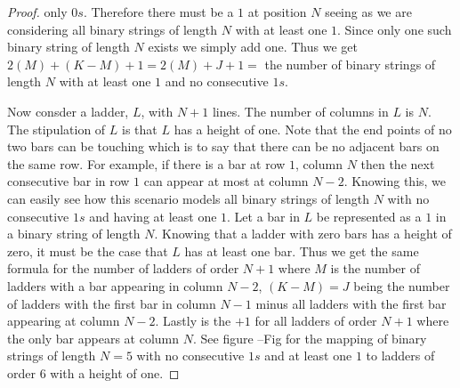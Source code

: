 \begin{proof}
    only $0s$. Therefore there must be a $1$ at position $N$ seeing as we are considering all binary strings of length $N$ with at least one $1$. 
    Since only one such binary string of length $N$ exists we simply add one. Thus we get $2(M)+(K-M)+1=2(M)+J+1=$ the number of binary strings of length $N$ with at least one $1$ and 
    no consecutive $1s$.\par 
    Now consder a ladder, $L$, with $N+1$ lines. The number of columns in $L$ is $N$. The stipulation of $L$ is that $L$ has a height of one. Note that the end points 
    of no two bars can be touching which is to say that there can be no adjacent bars on the same row. For example, if there is a bar at row $1$, column $N$ then 
    the next consecutive bar in row $1$ can appear at most at column $N-2$. Knowing this, we can easily see how this scenario models all binary strings of length $N$ with no 
    consecutive $1s$ and having at least one $1$. Let a bar in $L$ be represented as a $1$ in a binary string of length $N$. 
    Knowing that a ladder with zero bars has a height of zero, it must be the case that $L$ has at least one bar. Thus we get the same formula for the number of 
    ladders of order $N+1$ where $M$ is the number of ladders with a bar appearing in column $N-2$, $(K-M)=J$ being the number of ladders with the first bar in column $N-1$ minus 
    all ladders with the first bar appearing at column $N-2$. Lastly is the $+1$ for all ladders of order $N+1$ where the only bar appears at column $N$.
    See figure --Fig for the mapping of binary strings of length $N=5$ with no consecutive $1s$ and at least one $1$ to ladders of order $6$ with a height of one.\pagebreak

\end{proof}

